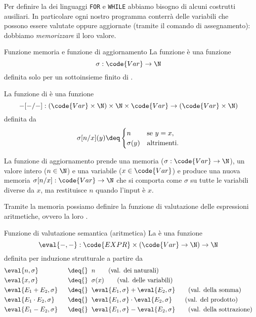 Per definire la  dei linguaggi \texttt{FOR} e \texttt{WHILE} abbiamo bisogno di alcuni costrutti ausiliari. In particolare ogni nostro programma conterrà delle variabili che possono essere valutate oppure aggiornate (tramite il comando di assegnamento): dobbiamo \emph{memorizzare} il loro valore.

\begin{definition}
    {Funzione memoria e funzione di aggiornamento}{}
    La funzione  è una funzione \[
        \sigma : \code{Var} \to \N
    \] definita solo per un sottoinsieme finito di .

    La funzione di  è una funzione \[
        \blank[\blank/\blank] : (\code{Var} \times \N) \times \N \times \code{Var} \to (\code{Var} \times \N)
    \] definita da \[
        \sigma[n/x](y) \deq \begin{cases}
            n &\text{se } y = x,\\
            \sigma(y) &\text{altrimenti.}
        \end{cases}
    \]
\end{definition}

\begin{remark}
    La funzione di aggiornamento prende una memoria ($\sigma : \code{Var} \to \N$), un valore intero ($n \in \N$) e una variabile ($x \in \code{Var}$) e produce una nuova memoria $\sigma[n/x] : \code{Var} \to \N$ che si comporta come $\sigma$ su tutte le variabili diverse da $x$, ma restituisce $n$ quando l'input è $x$. 
\end{remark}

Tramite la memoria possiamo definire la funzione di valutazione delle espressioni aritmetiche, ovvero la loro .

\begin{definition}
    {Funzione di valutazione semantica (aritmetica)}{}
    La  è una funzione \[
        \eval{\blank, \blank} : \code{EXPR} \times (\code{Var} \to \N) \to \N 
    \]
    definita per induzione strutturale a partire da 
    \begin{alignat*}{2}
        &\eval{n, \sigma} &&\;\;\deq{}\;\; n \tag{val. dei naturali}\\
        &\eval{x, \sigma} &&\;\;\deq{}\;\; \sigma(x) \tag{val. delle variabili}\\
        &\eval{E_1 + E_2, \sigma} &&\;\;\deq{}\;\; \eval{E_1, \sigma} + \eval{E_2, \sigma} \tag{val. della somma}\\
        &\eval{E_1 \cdot E_2, \sigma} &&\;\;\deq{}\;\; \eval{E_1, \sigma} \cdot \eval{E_2, \sigma}  \tag{val. del prodotto}\\
        &\eval{E_1 - E_2, \sigma} &&\;\;\deq{}\;\; \eval{E_1, \sigma} - \eval{E_2, \sigma} \tag{val. della sottrazione}
    \end{alignat*}
\end{definition}

